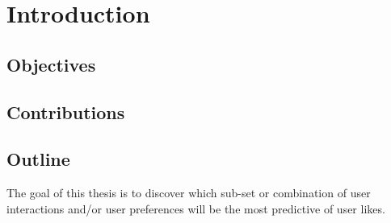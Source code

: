 
\chapter{Introduction}
\label{cha:intro}

\section{Objectives}
\label{sec:objectives}

\section{Contributions}
\label{sec:contributions}

\section{Outline}
\label{sec:outline}

The goal of this thesis is to discover which sub-set or combination of user interactions and/or user preferences will be the most predictive of user likes. 



